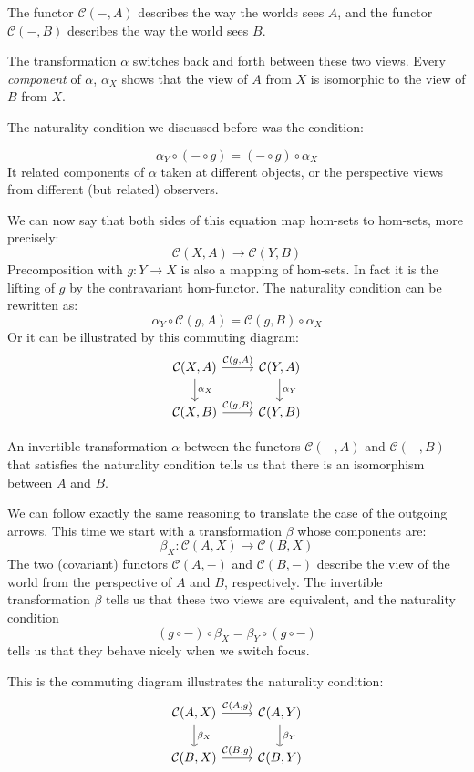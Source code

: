 \documentclass[DaoFP]{subfiles}
\begin{document}
The functor $\mathcal{C}(-, A)$ describes the way the worlds sees $A$, and the functor $\mathcal{C}(-, B)$ describes the way the world sees $B$. 

The transformation $\alpha$ switches back and forth between these two views. Every \emph{component} of $\alpha$, $\alpha_X$ shows that the view of $A$ from $X$ is isomorphic to the view of $B$ from $X$. 

The naturality condition we discussed before was the condition:

\[ \alpha_Y \circ (- \circ g) = (- \circ g) \circ \alpha_X \]
It related components of $\alpha$ taken at different objects, or the perspective views from different (but related) observers. 

We can now say that both sides of this equation map hom-sets to hom-sets, more precisely:
\[\mathcal{C}(X, A) \to \mathcal{C}(Y, B)\]
Precomposition with $g \colon Y \to X$ is also a mapping of hom-sets. In fact it is the lifting of $g$ by the contravariant hom-functor. The naturality condition can be rewritten as:
\[ \alpha_Y \circ \mathcal{C}(g, A) = \mathcal{C}(g, B) \circ \alpha_X \]
Or it can be illustrated by this commuting diagram:
\[
 \begin{tikzcd}
 \mathcal{C}(X, A)
 \arrow[d, "\alpha_X"]
 \arrow[r, "{\mathcal{C}(g, A)}"]
 &
 \mathcal{C}(Y, A)
  \arrow[d, "\alpha_Y"]
 \\
 \mathcal{C}(X, B)
 \arrow[r, "{\mathcal{C}(g, B)}"]
& \mathcal{C}(Y, B)
 \end{tikzcd}
\]

An invertible transformation $\alpha$ between the functors $\mathcal{C}(-, A)$ and $\mathcal{C}(-, B)$ that satisfies the naturality condition tells us that there is an isomorphism between $A$ and $B$.

We can follow exactly the same reasoning to translate the case of the outgoing arrows. This time we start with a transformation $\beta$ whose components are:
\[ \beta_X \colon \mathcal{C}(A, X) \to \mathcal{C}(B, X) \]
The two (covariant) functors $\mathcal{C}(A, -)$ and $\mathcal{C}(B, -)$ describe the view of the world from the perspective of $A$ and $B$, respectively. The invertible transformation $\beta$ tells us that these two views are equivalent, and the naturality condition 
\[ (g \circ -) \circ \beta_X = \beta_Y \circ (g \circ -) \]
tells us that they behave nicely when we switch focus.

This is the commuting diagram illustrates the naturality condition:
\[
 \begin{tikzcd}
 \mathcal{C}(A, X)
 \arrow[d, "\beta_X"]
 \arrow[r, "{\mathcal{C}(A, g)}"]
 &
 \mathcal{C}(A, Y)
  \arrow[d, "\beta_Y"]
 \\
 \mathcal{C}(B, X)
 \arrow[r, "{\mathcal{C}(B, g)}"]
& \mathcal{C}(B, Y)
 \end{tikzcd}
\]
\end{document}
